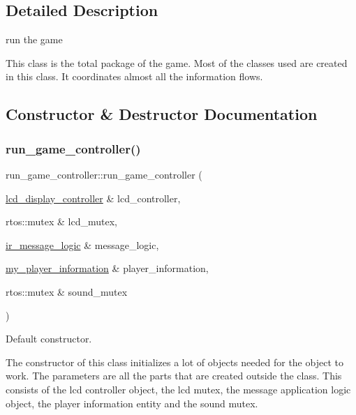 \subsection{Detailed Description}
run the game 

This class is the total package of the game. Most of the classes used are created in this class. It coordinates almost all the information flows. 

\subsection{Constructor \& Destructor Documentation}
\hypertarget{classrun__game__controller_aa61968bc65e1ad20a5065ccfd7d598da}{}\label{classrun__game__controller_aa61968bc65e1ad20a5065ccfd7d598da} 
\subsubsection{\texorpdfstring{run\+\_\+game\+\_\+controller()}{run\_game\_controller()}}
{\footnotesize\ttfamily run\+\_\+game\+\_\+controller\+::run\+\_\+game\+\_\+controller (\begin{DoxyParamCaption}\item[{\hyperlink{classlcd__display__controller}{lcd\+\_\+display\+\_\+controller} \&}]{lcd\+\_\+controller,  }\item[{rtos\+::mutex \&}]{lcd\+\_\+mutex,  }\item[{\hyperlink{classir__message__logic}{ir\+\_\+message\+\_\+logic} \&}]{message\+\_\+logic,  }\item[{\hyperlink{classmy__player__information}{my\+\_\+player\+\_\+information} \&}]{player\+\_\+information,  }\item[{rtos\+::mutex \&}]{sound\+\_\+mutex }\end{DoxyParamCaption})\hspace{0.3cm}{\ttfamily [inline]}}



Default constructor. 

The constructor of this class initializes a lot of objects needed for the object to work. The parameters are all the parts that are created outside the class. This consists of the lcd controller object, the lcd mutex, the message application logic object, the player information entity and the sound mutex. 

